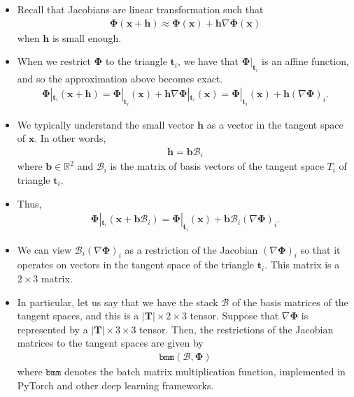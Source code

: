 \documentclass[10pt]{article}
\newcommand{\ve}[1]{\mathbf{#1}}
\newcommand{\ves}[1]{\boldsymbol{#1}}
\newcommand{\mcal}[1]{\mathcal{#1}}
\newcommand{\Real}{\mathbb{R}}
\begin{document}
\begin{itemize}
    \item Recall that Jacobians are linear transformation such that
    \begin{align*}
        \ves{\Phi}(\ve{x} + \ve{h}) \approx \ves{\Phi}(\ve{x}) + \ve{h} \nabla \ves{\Phi}(\ve{x})
    \end{align*}
    when $\ve{h}$ is small enough.

    \item When we restrict $\ves\Phi$ to the triangle $\ve{t}_i$, we have that $\ves\Phi|_{\ve{t}_i}$ is an affine function, and so the approximation above becomes exact.
    \begin{align*}
        \ves{\Phi}|_{\ve{t}_i}(\ve{x} + \ve{h}) 
        = \ves{\Phi}|_{\ve{t}_i}(\ve{x}) + \ve{h} \nabla \ves{\Phi}|_{\ve{t}_i}(\ve{x}) 
        = \ves{\Phi}|_{\ve{t}_i}(\ve{x}) + \ve{h} (\nabla \ves{\Phi})_i.
    \end{align*}

    \item We typically understand the small vector $\ve{h}$ as a vector in the tangent space of $\ve{x}$. In other words,
    \begin{align*}
        \ve{h} = \ve{b} \mcal{B}_i
    \end{align*}
    where $\ve{b} \in \Real^2$ and $\mcal{B}_i$ is the matrix of basis vectors of the tangent space $T_i$ of triangle $\ve{t}_i$.

    \item Thus,
    \begin{align*}
        \ves{\Phi}|_{\ve{t}_i}(\ve{x} + \ve{b}\mcal{B}_i)         
        = \ves{\Phi}|_{\ve{t}_i}(\ve{x}) + \ve{b} \mcal{B}_i (\nabla \ves{\Phi})_i.
    \end{align*}

    \item We can view $\mcal{B}_i(\nabla \ves{\Phi})_i$ as a restriction of the Jacobian $(\nabla \ves{\Phi})_i$ so that it operates on vectors in the tangent space of the triangle $\ve{t}_i$. This matrix is a $2 \times 3$ matrix.
    
    \item In particular, let us say that we have the stack $\mcal{B}$ of the basis matrices of the tangent spaces, and this is a $|\ve{T}| \times 2 \times 3$ tensor. Suppose that $\nabla \ves{\Phi}$ is represented by a $|\ve{T}| \times 3 \times 3$ tensor. Then, the restrictions of the Jacobian matrices to the tangent spaces are given by
    \begin{align*}
        \texttt{bmm}(\mcal{B}, \ves{\Phi})
    \end{align*}
    where $\texttt{bmm}$ denotes the batch matrix multiplication function, implemented in PyTorch and other deep learning frameworks.
\end{itemize}
\end{document}
